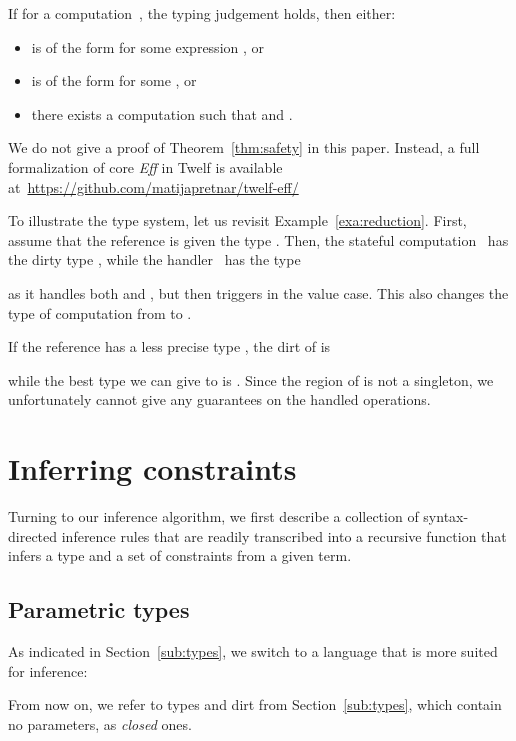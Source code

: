 \documentclass{LMCS}
\newcommand{\Eff}{\emph{Eff}\xspace}
\begin{document}
\begin{thm}[Safety]
\label{thm:safety}
If for a computation~, the typing judgement  holds, then either:
\begin{itemize}
\item
   is of the form  for some expression , or
\item
   is of the form  for some , or
\item
  there exists a computation  such that  and .
\end{itemize}
\end{thm}

We do not give a proof of Theorem~\ref{thm:safety} in this paper.
Instead, a full formalization of core \Eff in Twelf is available at~\url{https://github.com/matijapretnar/twelf-eff/}

\begin{exa}
To illustrate the type system, let us revisit Example~\ref{exa:reduction}.
First, assume that the reference  is given the type .
Then, the stateful computation~ has the dirty type
,
while the handler~ has the type

as it handles both  and , but then triggers  in the value case.
This  also changes the type of computation from  to .

If the reference  has a less precise type ,
the dirt of  is 

while the best type we can give to  is .
Since the region of  is not a singleton,
we unfortunately cannot give any guarantees on the handled operations.
\end{exa}

\section{Inferring constraints}
\label{sec:inferring}

Turning to our inference algorithm, we first describe
a collection of syntax-directed inference rules
that are readily transcribed into a recursive function that
infers a type and a set of constraints from a given term.


\subsection{Parametric types}
\label{sub:parametric-types}

As indicated in Section~\ref{sub:types}, we switch to a language that is more suited for inference:

From now on, we refer to types and dirt from Section~\ref{sub:types},
which contain no parameters, as \emph{closed} ones.
\end{document}
